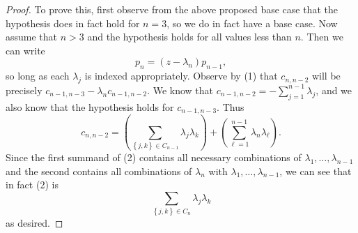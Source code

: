 \documentclass{article}
\theoremstyle{definition}
\begin{document}
\begin{proof}
	To prove this, first observe from the above proposed base case that the hypothesis does in fact hold for $n = 3$, so we do in fact have a base case.
	Now assume that $n > 3$ and the hypothesis holds for all values less than $n$.
	Then we can write \begin{equation*}
		p_n = (z - \lambda_n)p_{n - 1}, \tag{1}
	\end{equation*}
	so long as each $\lambda_j$ is indexed appropriately.
	Observe by (1) that $c_{n, n - 2}$ will be precisely $c_{n - 1, n - 3} - \lambda_n c_{n - 1, n - 2}$.
	We know that $c_{n - 1, n - 2} = -\sum _{j = 1}^{n - 1} \lambda_j$, and we also know that the hypothesis holds for $c_{n - 1, n - 3}$.
	Thus \begin{equation*}
		c_{n, n - 2} = \left(\sum _{\left\lbrace j, k \right\rbrace \in C_{n - 1} } \lambda_j \lambda_k\right) + \left( \sum_{\ell = 1}^{n - 1} \lambda_n \lambda_\ell \right). \tag{2}
	\end{equation*}
	Since the first summand of (2) contains all necessary combinations of $\lambda_1, \dots, \lambda_{n - 1}$ and the second contains all combinations of $\lambda_n$ with $\lambda_1, \dots, \lambda_{n - 1}$, we can see that in fact (2) is \begin{equation*}
		\sum_{\left\lbrace j, k \right\rbrace \in C_n} \lambda_j \lambda_k
	\end{equation*}
	as desired.


\end{proof}
\end{document}
